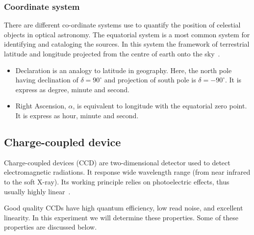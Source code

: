 \subsubsection{Coordinate system}
There are different co-ordinate systems 
use to quantify the position of celestial objects in optical astronomy. The equatorial system is a most common system for identifying and cataloging the sources. In this system the framework of terrestrial latitude and longitude projected from the centre of earth onto the sky~\cite{manual}.
\begin{itemize}
	\item Declaration is an analogy to latitude in geography. Here, the north pole having declination of $ \delta=90^{\circ} $ and projection of south pole is  $ \delta= -90^{\circ} $. It is express as degree, minute and second. 
	\item Right Ascension, $\alpha $, is equivalent to longitude with the equatorial zero point. It is express as hour, minute and second.
\end{itemize}

\subsection{Charge-coupled device}
Charge-coupled devices (CCD) are two-dimensional detector used to detect electromagnetic radiations. It response wide wavelength range (from near infrared to the soft X-ray). Its working principle relies on photoelectric effects, thus usually highly linear~\cite{manual}.


Good quality CCDs have high quantum efficiency, low read noise, and excellent linearity. In this experiment we will determine these properties. Some of these properties are discussed below.

